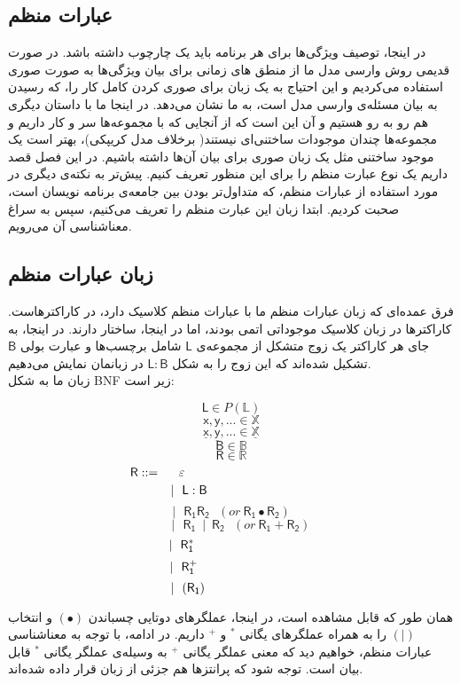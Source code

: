 \subsection{عبارات منظم}
در اینجا، توصیف ویژگی‌ها برای هر برنامه باید یک چارچوب داشته باشد. در صورت قدیمی روش وارسی مدل ما از منطق های زمانی برای بیان ویژگی‌ها به صورت صوری استفاده می‌کردیم و این احتیاج به یک زبان برای صوری کردن کامل کار را، که رسیدن به بیان مسئله‌ی وارسی مدل است، به ما نشان می‌دهد. در اینجا ما با داستان دیگری هم رو به رو هستیم و آن این است که از آنجایی که با مجموعه‌ها سر و کار داریم و مجموعه‌ها چندان موجودات ساختنی‌ای نیستند( برخلاف مدل کریپکی)، بهتر است یک موجود ساختنی مثل یک زبان صوری برای بیان آن‌ها داشته باشیم. در این فصل قصد داریم یک نوع عبارت منظم را برای این منظور تعریف کنیم. پیش‌تر به نکته‌ی دیگری در مورد استفاده از عبارات منظم، که متداول‌تر بودن بین جامعه‌ی برنامه نویسان است، صحبت کردیم. ابتدا زبان این عبارت منظم را تعریف می‌کنیم، سپس به سراغ معناشناسی آن می‌رویم. 
\subsection{زبان عبارات منظم}
فرق عمده‌ای که زبان عبارات منظم ما با عبارات منظم کلاسیک دارد، در کاراکترهاست. کاراکترها در زبان کلاسیک موجوداتی اتمی بودند، اما در اینجا، ساختار دارند. در اینجا، به جای هر کاراکتر یک زوج متشکل از مجموعه‌ی $\mathsf{L}$ شامل برچسب‌ها و عبارت بولی $\mathsf{B}$ تشکیل شده‌اند که این زوج را به شکل 
$\mathsf{L : B}$
در زبانمان نمایش می‌دهیم.\\ 
زبان ما به شکل BNF زیر است:
\begin{defn}
$$\mathsf{L} \in \mathit{P}(\mathbb{L})$$        
$$\mathsf{x,y,...} \in \mathbb{X}$$
$$\mathsf{\underline{x},\underline{y},...} \in \mathbb{\underline{X}}$$
$$\mathsf{B} \in \mathbb{B}$$
$$\mathsf{R} \in \mathbb{R}$$
$$\mathsf{R} ::=\hspace{0.5cm} \varepsilon\hspace{4.2cm}$$
$$|\:\:\:\mathsf{L : B}\hspace{2.4cm}$$
$$|\:\:\:\mathsf{R_1 R_2}\:\:\:(or\:\mathsf{R_1 \bullet R_2 })$$
$$\:\:\:\:\:\:\:|\:\:\:\mathsf{R_1\:\mid\:R_2}\:\:\:(or\:\mathsf{R_1 + R_2 })$$
$$|\:\:\:\mathsf{R_1^*}\hspace{2.8cm}$$
$$|\:\:\:\mathsf{R_1^+}\hspace{2.7cm}$$
$$|\:\:\:(\mathsf{R_1})\hspace{2.47cm}$$
\end{defn}
همان طور که قابل مشاهده است، در اینجا، عملگرهای دوتایی چسباندن
$(\bullet)$
 و انتخاب
$(|)$
 را به همراه عملگرهای یگانی 
$^*$
و
$^+$
داریم.
در ادامه، با توجه به معناشناسی عبارات منظم، خواهیم دید که معنی عملگر یگانی 
$^+$
به وسیله‌ی عملگر یگانی $^*$ قابل بیان است.
توجه شود که پرانتزها هم جزئی از زبان قرار داده شده‌اند.



